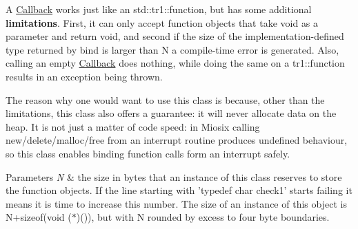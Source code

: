 A \hyperlink{classmiosix_1_1_callback}{Callback} works just like an std\-::tr1\-::function, but has some additional {\bfseries limitations}. First, it can only accept function objects that take void as a parameter and return void, and second if the size of the implementation-\/defined type returned by bind is larger than N a compile-\/time error is generated. Also, calling an empty \hyperlink{classmiosix_1_1_callback}{Callback} does nothing, while doing the same on a tr1\-::function results in an exception being thrown.

The reason why one would want to use this class is because, other than the limitations, this class also offers a guarantee\-: it will never allocate data on the heap. It is not just a matter of code speed\-: in Miosix calling new/delete/malloc/free from an interrupt routine produces undefined behaviour, so this class enables binding function calls form an interrupt safely.


\begin{DoxyParams}{Parameters}
{\em N} & the size in bytes that an instance of this class reserves to store the function objects. If the line starting with 'typedef char check1' starts failing it means it is time to increase this number. The size of an instance of this object is N+sizeof(void ($\ast$)()), but with N rounded by excess to four byte boundaries. \\
\hline
\end{DoxyParams}


